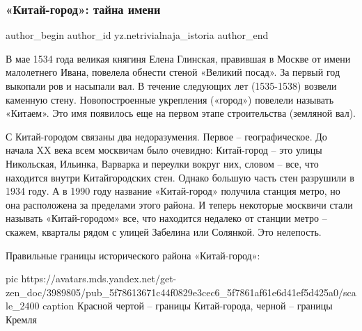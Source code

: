  
 
 
 
 
 
\subsubsection{«Китай-город»: тайна имени}
\label{sec:03_10_2020.sites.ru.zen_yandex.yz.netrivialnaja_istoria.1.kitaj_gorod_moskva_tajna}
\ifcmt
	author_begin
   author_id yz.netrivialnaja_istoria
	author_end
\fi


В мае 1534 года великая княгиня Елена Глинская, правившая в Москве от имени
малолетнего Ивана, повелела обнести стеной «Великий посад». За первый год
выкопали ров и насыпали вал. В течение следующих лет (1535-1538) возвели
каменную стену. Новопостроенные укрепления («город») повелели называть
«Китаем». Это имя появилось еще на первом этапе строительства (земляной вал).

С Китай-городом связаны два недоразумения. Первое – географическое. До начала
XX века всем москвичам было очевидно: Китай-город – это улицы Никольская,
Ильинка, Варварка и переулки вокруг них, словом – все, что находится внутри
Китайгородских стен. Однако большую часть стен разрушили в 1934 году. А в 1990
году название «Китай-город» получила станция метро, но она расположена за
пределами этого района. И теперь некоторые москвичи стали называть
«Китай-городом» все, что находится недалеко от станции метро – скажем, кварталы
рядом с улицей Забелина или Солянкой. Это нелепость.

Правильные границы исторического района «Китай-город»:

\ifcmt
pic https://avatars.mds.yandex.net/get-zen_doc/3989805/pub_5f78613671c44f0829e3cec6_5f7861af61e6d41ef5d425a0/scale_2400
caption Красной чертой – границы Китай-города, черной – границы Кремля
\fi

